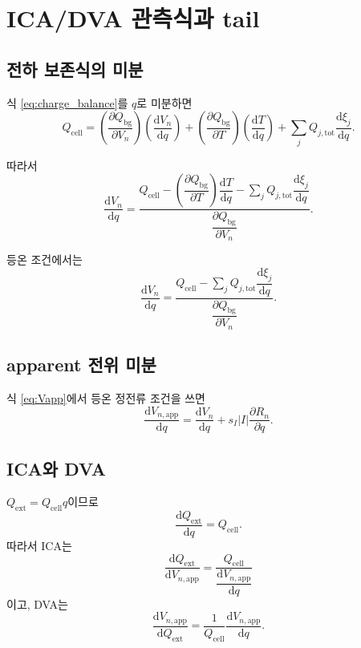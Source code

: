 \documentclass[11pt]{article}
\newcommand{\dd}{\mathrm{d}}
\newcommand{\ext}{\mathrm{ext}}
\newcommand{\cell}{\mathrm{cell}}
\newcommand{\bg}{\mathrm{bg}}
\newcommand{\app}{\mathrm{app}}
\newcommand{\tot}{\mathrm{tot}}
\begin{document}
\section{ICA/DVA 관측식과 tail}

\subsection{전하 보존식의 미분}

식 \eqref{eq:charge_balance}를 \(q\)로 미분하면
\begin{equation}
Q_{\cell}
=
\left(\frac{\partial Q_{\bg}}{\partial V_n}\right)
\left(\frac{\dd V_n}{\dd q}\right)
+
\left(\frac{\partial Q_{\bg}}{\partial T}\right)
\left(\frac{\dd T}{\dd q}\right)
+
\sum_j Q_{j,\tot}
\frac{\dd \xi_j}{\dd q}.
\end{equation}

따라서
\begin{equation}
\boxed{
\frac{\dd V_n}{\dd q}
=
\frac{
Q_{\cell}
-
\left(\dfrac{\partial Q_{\bg}}{\partial T}\right)
\dfrac{\dd T}{\dd q}
-
\sum_j Q_{j,\tot}\dfrac{\dd \xi_j}{\dd q}
}{
\dfrac{\partial Q_{\bg}}{\partial V_n}
}.
}
\label{eq:dVndq_general}
\end{equation}

등온 조건에서는
\begin{equation}
\boxed{
\frac{\dd V_n}{\dd q}
=
\frac{
Q_{\cell}
-
\sum_j Q_{j,\tot}\dfrac{\dd \xi_j}{\dd q}
}{
\dfrac{\partial Q_{\bg}}{\partial V_n}
}.
}
\label{eq:dVndq_iso}
\end{equation}

\subsection{apparent 전위 미분}

식 \eqref{eq:Vapp}에서 등온 정전류 조건을 쓰면
\begin{equation}
\boxed{
\frac{\dd V_{n,\app}}{\dd q}
=
\frac{\dd V_n}{\dd q}
+
s_I|I|\frac{\partial R_n}{\partial q}.
}
\label{eq:dVappdq}
\end{equation}

\subsection{ICA와 DVA}

\(Q_{\ext}=Q_{\cell}q\)이므로
\begin{equation}
\frac{\dd Q_{\ext}}{\dd q}
=
Q_{\cell}.
\end{equation}
따라서 ICA는
\begin{equation}
\boxed{
\frac{\dd Q_{\ext}}{\dd V_{n,\app}}
=
\frac{Q_{\cell}}
{\dfrac{\dd V_{n,\app}}{\dd q}}
}
\label{eq:ica}
\end{equation}
이고, DVA는
\begin{equation}
\boxed{
\frac{\dd V_{n,\app}}{\dd Q_{\ext}}
=
\frac{1}{Q_{\cell}}
\frac{\dd V_{n,\app}}{\dd q}.
}
\label{eq:dva}
\end{equation}
\end{document}
